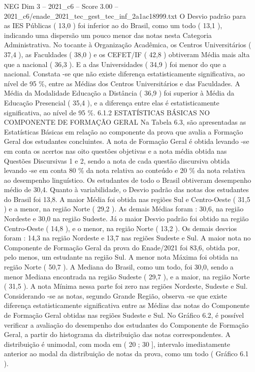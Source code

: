 \begin{textsample}{NEG Dim 3 – 2021\_c6 – Score 3.00 – 2021\_c6/enade\_2021\_tec\_gest\_tec\_inf\_2a1ac18999.txt}
O Desvio padrão para as IES Públicas ( 13,0 ) foi inferior ao do Brasil, como um todo ( 13,1 ), indicando uma dispersão um pouco menor das notas nesta Categoria Administrativa.
No tocante à Organização Acadêmica, os Centros Universitários ( 37,4 ), as Faculdades ( 38,0 ) e os CEFET/IF ( 42,8 ) obtiveram Média mais alta que a nacional ( 36,3 ).
E a das Universidades ( 34,9 ) foi menor do que a nacional.
Constata -se que não existe diferença estatisticamente significativa, ao nível de 95 \%, entre as Médias dos Centros Universitários e das Faculdades.
A Média da Modalidade Educação a Distância ( 36,9 ) foi superior à Média da Educação Presencial ( 35,4 ), e a diferença entre elas é estatisticamente significativa, ao nível de 95 \%. 6.1.2 ESTATÍSTICAS BÁSICAS NO COMPONENTE DE FORMAÇÃO GERAL Na Tabela 6.3, são apresentadas as Estatísticas Básicas em relação ao componente da prova que avalia a Formação Geral dos estudantes concluintes.
A nota de Formação Geral é obtida levando -se em conta os acertos nas oito questões objetivas e a nota média obtida nas Questões Discursivas 1 e 2, sendo a nota de cada questão discursiva obtida levando -se em conta 80 \% da nota relativa ao conteúdo e 20 \% da nota relativa ao desempenho linguístico.
Os estudantes de todo o Brasil obtiveram desempenho médio de 30,4.
Quanto à variabilidade, o Desvio padrão das notas dos estudantes do Brasil foi 13,8.
A maior Média foi obtida nas regiões Sul e Centro-Oeste ( 31,5 ) e a menor, na região Norte ( 29,2 ).
As demais Médias foram : 30,6, na região Nordeste e 30,0 na região Sudeste.
Já o maior Desvio padrão foi obtido na região Centro-Oeste ( 14,8 ), e o menor, na região Norte ( 13,2 ).
Os demais desvios foram : 14,3 na região Nordeste e 13,7 nas regiões Sudeste e Sul.
A maior nota no Componente de Formação Geral da prova do Enade/2021 foi 83,6, obtida por, pelo menos, um estudante na região Sul.
A menor nota Máxima foi obtida na região Norte ( 50,7 ).
A Mediana do Brasil, como um todo, foi 30,0, sendo a menor Mediana encontrada na região Sudeste ( 29,7 ), e a maior, na região Norte ( 31,5 ).
A nota Mínima nessa parte foi zero nas regiões Nordeste, Sudeste e Sul.
Considerando -se as notas, segundo Grande Região, observa -se que existe diferença estatisticamente significativa entre as Médias das notas do Componente de Formação Geral obtidas nas regiões Sudeste e Sul.
No Gráfico 6.2, é possível verificar a avaliação do desempenho dos estudantes do Componente de Formação Geral, a partir do histograma da distribuição das notas correspondentes.
A distribuição é unimodal, com moda em ( 20 ; 30 ], intervalo imediatamente anterior ao modal da distribuição de notas da prova, como um todo ( Gráfico 6.1 ).

\end{textsample}
